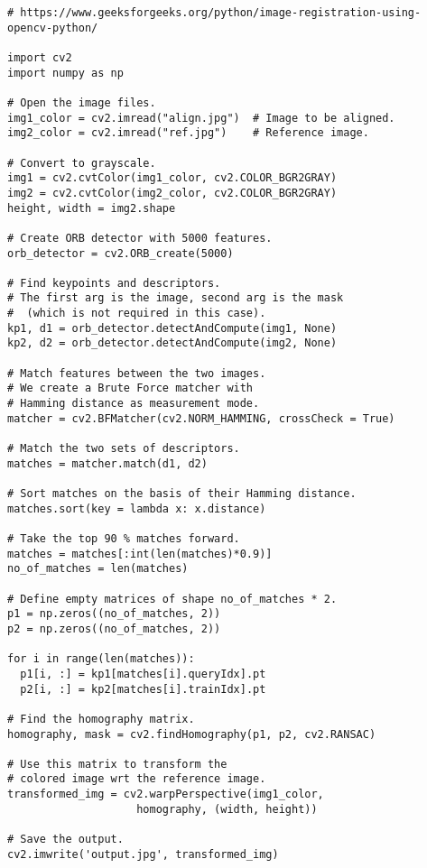 \begin{verbatim}
# https://www.geeksforgeeks.org/python/image-registration-using-opencv-python/

import cv2
import numpy as np

# Open the image files.
img1_color = cv2.imread("align.jpg")  # Image to be aligned.
img2_color = cv2.imread("ref.jpg")    # Reference image.

# Convert to grayscale.
img1 = cv2.cvtColor(img1_color, cv2.COLOR_BGR2GRAY)
img2 = cv2.cvtColor(img2_color, cv2.COLOR_BGR2GRAY)
height, width = img2.shape

# Create ORB detector with 5000 features.
orb_detector = cv2.ORB_create(5000)

# Find keypoints and descriptors.
# The first arg is the image, second arg is the mask
#  (which is not required in this case).
kp1, d1 = orb_detector.detectAndCompute(img1, None)
kp2, d2 = orb_detector.detectAndCompute(img2, None)

# Match features between the two images.
# We create a Brute Force matcher with 
# Hamming distance as measurement mode.
matcher = cv2.BFMatcher(cv2.NORM_HAMMING, crossCheck = True)

# Match the two sets of descriptors.
matches = matcher.match(d1, d2)

# Sort matches on the basis of their Hamming distance.
matches.sort(key = lambda x: x.distance)

# Take the top 90 % matches forward.
matches = matches[:int(len(matches)*0.9)]
no_of_matches = len(matches)

# Define empty matrices of shape no_of_matches * 2.
p1 = np.zeros((no_of_matches, 2))
p2 = np.zeros((no_of_matches, 2))

for i in range(len(matches)):
  p1[i, :] = kp1[matches[i].queryIdx].pt
  p2[i, :] = kp2[matches[i].trainIdx].pt

# Find the homography matrix.
homography, mask = cv2.findHomography(p1, p2, cv2.RANSAC)

# Use this matrix to transform the
# colored image wrt the reference image.
transformed_img = cv2.warpPerspective(img1_color,
                    homography, (width, height))

# Save the output.
cv2.imwrite('output.jpg', transformed_img)

\end{verbatim}